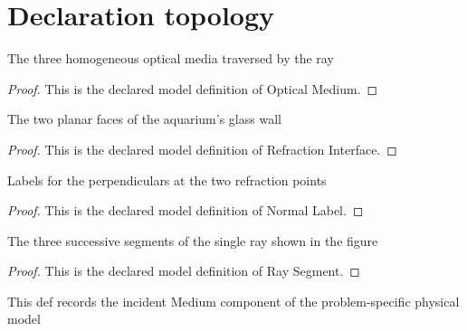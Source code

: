 \section{Declaration topology}
\begin{definition}
  \label{def:physics:phyx-mini-0143:phyxminiproblems-problemphyxmini0143-opticalmedium}
  The three homogeneous optical media traversed by the ray
\end{definition}
\begin{proof}
  This is the declared model definition of Optical Medium.
\end{proof}
\begin{definition}
  \label{def:physics:phyx-mini-0143:phyxminiproblems-problemphyxmini0143-refractioninterface}
  The two planar faces of the aquarium's glass wall
\end{definition}
\begin{proof}
  This is the declared model definition of Refraction Interface.
\end{proof}
\begin{definition}
  \label{def:physics:phyx-mini-0143:phyxminiproblems-problemphyxmini0143-normallabel}
  Labels for the perpendiculars at the two refraction points
\end{definition}
\begin{proof}
  This is the declared model definition of Normal Label.
\end{proof}
\begin{definition}
  \label{def:physics:phyx-mini-0143:phyxminiproblems-problemphyxmini0143-raysegment}
  The three successive segments of the single ray shown in the figure
\end{definition}
\begin{proof}
  This is the declared model definition of Ray Segment.
\end{proof}
\begin{definition}
  \label{def:physics:phyx-mini-0143:phyxminiproblems-problemphyxmini0143-refractioninterface-incidentmedium}
  This def records the incident Medium component of the problem-specific physical model
\end{definition}
